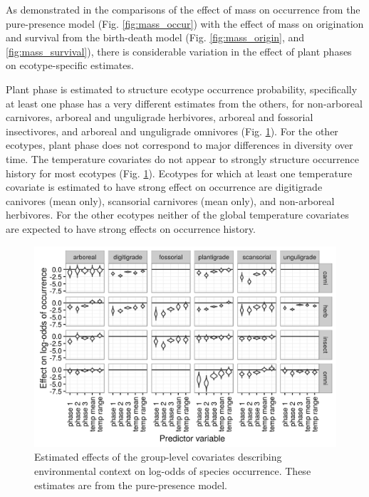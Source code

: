 \documentclass[12pt,letterpaper]{article}
\begin{document}
As demonstrated in the comparisons of the effect of mass on occurrence from the pure-presence model (Fig. \ref{fig:mass_occur}) with the effect of mass on origination and survival from the birth-death model (Fig. \ref{fig:mass_origin}, and \ref{fig:mass_survival}), there is considerable variation in the effect of plant phases on ecotype-specific estimates.


Plant phase is estimated to structure ecotype occurrence probability, specifically at least one phase has a very different estimates from the others, for non-arboreal carnivores, arboreal and unguligrade herbivores, arboreal and fossorial insectivores, and arboreal and unguligrade omnivores (Fig. \ref{fig:group_pure_presence}). For the other ecotypes, plant phase does not correspond to major differences in diversity over time. 
The temperature covariates do not appear to strongly structure occurrence history for most ecotypes (Fig. \ref{fig:group_pure_presence}). Ecotypes for which at least one temperature covariate is estimated to have strong effect on occurrence are digitigrade canivores (mean only), scansorial carnivores (mean only), and non-arboreal herbivores. For the other ecotypes neither of the global temperature covariates are expected to have strong effects on occurrence history.

  \begin{figure}[ht]
  \centering
  \includegraphics[width=\textwidth,height=0.5\textheight,keepaspectratio=true]{figure/group_on_ecotype}
  \caption[Effects of group-level covariates on log-odds of ecotype occurrence as estimated from the the pure-presence model]{Estimated effects of the group-level covariates describing environmental context on log-odds of species occurrence. These estimates are from the pure-presence model.} 
  \label{fig:group_pure_presence}
\end{figure}
\end{document}
